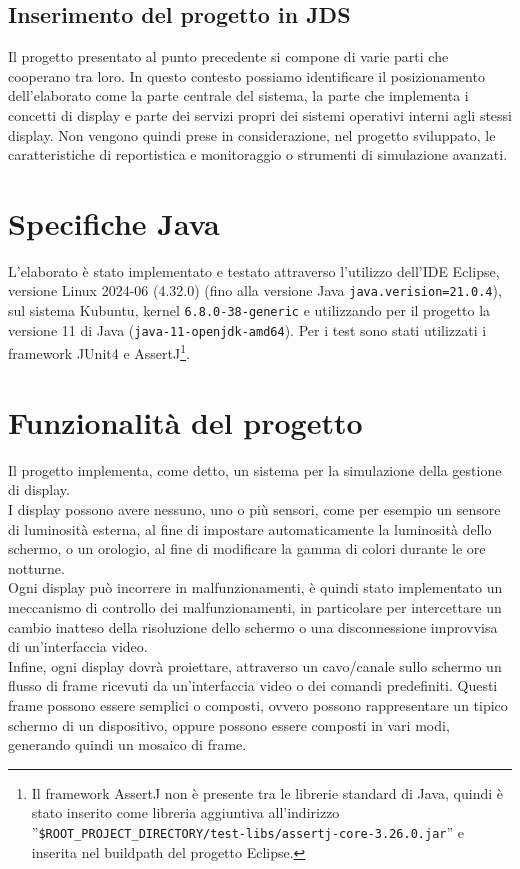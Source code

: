 \documentclass[a4paper,11pt]{article}
\begin{document}
	\subsection{Inserimento del progetto in JDS} \label{jds:inserimento-elaborato}
	Il progetto presentato al punto precedente si compone di varie parti che cooperano tra loro. In questo contesto possiamo identificare il posizionamento dell'elaborato come la parte centrale del sistema, la parte che implementa i concetti di display e parte dei servizi propri dei sistemi operativi interni agli stessi display. Non vengono quindi prese in considerazione, nel progetto sviluppato, le caratteristiche di reportistica e monitoraggio o strumenti di simulazione avanzati.
		
	\section{Specifiche Java}
	L'elaborato è stato implementato e testato attraverso l'utilizzo dell'IDE Eclipse, versione Linux 2024-06 (4.32.0) (fino alla versione Java \texttt{java.verision=21.0.4}), sul sistema Kubuntu, kernel \texttt{6.8.0-38-generic} e utilizzando per il progetto la versione 11 di Java (\texttt{java-11-openjdk-amd64}).
	Per i test sono stati utilizzati i framework JUnit4 e AssertJ\footnote{Il framework AssertJ non è presente tra le librerie standard di Java, quindi è stato inserito come libreria aggiuntiva all'indirizzo ''\texttt{\$ROOT\_PROJECT\_DIRECTORY/test-libs/assertj-core-3.26.0.jar}'' e inserita nel buildpath del progetto Eclipse.}.
	
	\section{Funzionalità del progetto}
	Il progetto implementa, come detto, un sistema per la simulazione della gestione di display.\\
	I display possono avere nessuno, uno o più sensori, come per esempio un sensore di luminosità esterna, al fine di impostare automaticamente la luminosità dello schermo, o un orologio, al fine di modificare la gamma di colori durante le ore notturne.\\
	Ogni display può incorrere in malfunzionamenti, è quindi stato implementato un meccanismo di controllo dei malfunzionamenti, in particolare per intercettare un cambio inatteso della risoluzione dello schermo o una disconnessione improvvisa di un'interfaccia video.\\
	Infine, ogni display dovrà proiettare, attraverso un cavo/canale sullo schermo un flusso di frame ricevuti da un'interfaccia video o dei comandi predefiniti. Questi frame possono essere semplici o composti, ovvero possono rappresentare un tipico schermo di un dispositivo, oppure possono essere composti in vari modi, generando quindi un mosaico di frame.
	
\end{document}
